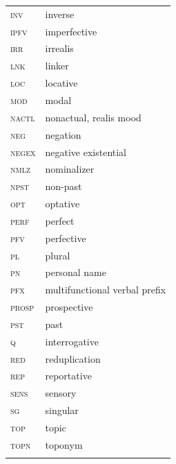 \documentclass[output=paper,colorlinks,citecolor=brown]{langscibook}
\begin{document}
\begin{tabularx}{.45\textwidth}{lQ}
 \scshape inv  & inverse\\
 \scshape ipfv  & imperfective\\
 \scshape irr  & irrealis\\
 \scshape lnk  & linker\\
 \scshape loc  & locative\\
 \scshape mod  & modal\\
 \scshape nactl  & nonactual, realis mood\\
 \scshape neg  & negation\\
 \scshape negex  & negative existential \\
  \scshape nmlz  & nominalizer\\
 \scshape npst  & non-past \\
 \scshape opt  & optative\\
 \scshape perf  & perfect\\
 \scshape pfv  & perfective\\
 \scshape pl  & plural\\
 \scshape pn  & personal name\\
 \scshape pfx  & multifunctional verbal prefix\\
 \scshape prosp  & prospective\\
 \scshape pst  & past \\
 \scshape q  & interrogative\\
 \scshape red  & reduplication\\
 \scshape rep  & reportative \\
 \scshape sens  & sensory \\
 \scshape sg  & singular\\
 \scshape top  & topic\\
 \scshape topn  & toponym\\
 \\
\end{tabularx}

\printbibliography[heading=subbibliography,notkeyword=this]
\end{document}
